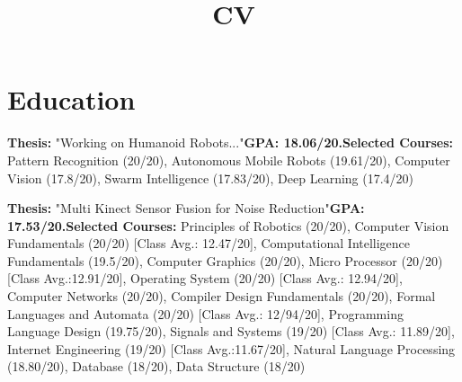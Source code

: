 \documentclass[11pt,a4paper,roman]{moderncv} %
\title{CV}
\begin{document}
\makecvtitle %

\section{Education}

{\textbf{Thesis:} "Working on Humanoid Robots..."\newline{}\textbf{GPA: 18.06/20.}\newline{}\textbf{Selected Courses:} Pattern Recognition (20/20), Autonomous Mobile Robots (19.61/20), Computer Vision (17.8/20), Swarm Intelligence (17.83/20), Deep Learning (17.4/20) }  %

{\textbf{Thesis:} "Multi Kinect Sensor Fusion for Noise Reduction"\newline{}\textbf{GPA: 17.53/20.}\newline{}\textbf{Selected Courses:} Principles of Robotics (20/20), Computer Vision Fundamentals (20/20) [Class Avg.: 12.47/20], Computational Intelligence Fundamentals (19.5/20), Computer Graphics (20/20), Micro Processor (20/20) [Class Avg.:12.91/20], Operating System (20/20) [Class Avg.: 12.94/20], Computer Networks (20/20), Compiler Design Fundamentals (20/20), Formal Languages and Automata (20/20) [Class Avg.: 12/94/20], Programming Language Design (19.75/20), Signals and Systems (19/20) [Class Avg.: 11.89/20], Internet Engineering (19/20) [Class Avg.:11.67/20], Natural Language Processing (18.80/20), Database (18/20), Data Structure (18/20)} 


\end{document}
